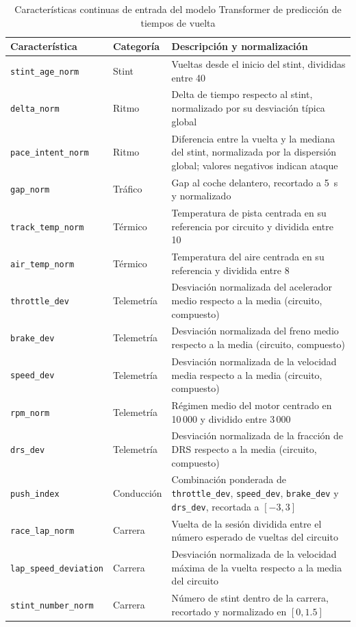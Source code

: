 \begin{table}[htbp]
\centering
\caption{Características continuas de entrada del modelo Transformer de predicción de tiempos de vuelta}
\label{tab:features_transformer}
\small
\begin{tabularx}{\textwidth}{llX}
\toprule
\textbf{Característica} & \textbf{Categoría} & \textbf{Descripción y normalización} \\
\midrule
\texttt{stint\_age\_norm}        & Stint        & Vueltas desde el inicio del stint, divididas entre 40 \\
\texttt{delta\_norm}             & Ritmo        & Delta de tiempo respecto al stint, normalizado por su desviación típica global \\
\texttt{pace\_intent\_norm}      & Ritmo        & Diferencia entre la vuelta y la mediana del stint, normalizada por la dispersión global; valores negativos indican ataque \\
\texttt{gap\_norm}               & Tráfico      & Gap al coche delantero, recortado a 5~s y normalizado \\
\texttt{track\_temp\_norm}       & Térmico      & Temperatura de pista centrada en su referencia por circuito y dividida entre 10 \\
\texttt{air\_temp\_norm}         & Térmico      & Temperatura del aire centrada en su referencia y dividida entre 8 \\
\texttt{throttle\_dev}           & Telemetría   & Desviación normalizada del acelerador medio respecto a la media (circuito, compuesto) \\
\texttt{brake\_dev}              & Telemetría   & Desviación normalizada del freno medio respecto a la media (circuito, compuesto) \\
\texttt{speed\_dev}              & Telemetría   & Desviación normalizada de la velocidad media respecto a la media (circuito, compuesto) \\
\texttt{rpm\_norm}               & Telemetría   & Régimen medio del motor centrado en 10\,000 y dividido entre 3\,000 \\
\texttt{drs\_dev}                & Telemetría   & Desviación normalizada de la fracción de DRS respecto a la media (circuito, compuesto) \\
\texttt{push\_index}             & Conducción   & Combinación ponderada de \texttt{throttle\_dev}, \texttt{speed\_dev}, \texttt{brake\_dev} y \texttt{drs\_dev}, recortada a $[-3,3]$ \\
\texttt{race\_lap\_norm}         & Carrera      & Vuelta de la sesión dividida entre el número esperado de vueltas del circuito \\
\texttt{lap\_speed\_deviation}   & Carrera      & Desviación normalizada de la velocidad máxima de la vuelta respecto a la media del circuito \\
\texttt{stint\_number\_norm}     & Carrera      & Número de stint dentro de la carrera, recortado y normalizado en $[0,1.5]$ \\
\bottomrule
\end{tabularx}
\end{table}

